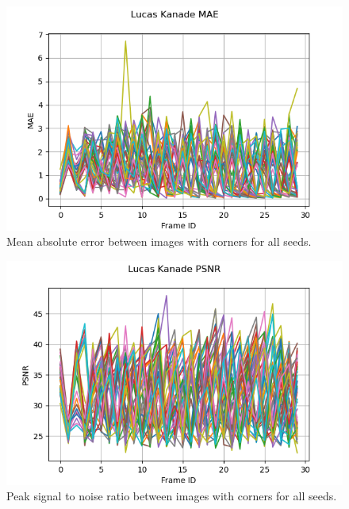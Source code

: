 \documentclass[11pt, conference, letterpaper]{IEEEtran}
\begin{document}
\begin{figure}[h]
    \centering
    \includegraphics[width=\linewidth]{mc_images/mc_lk_mae.png}
    \caption{Mean absolute error between images with corners for all seeds.}
    \label{fig:mc_lk_mae}
\end{figure}

\begin{figure}[h]
    \centering
    \includegraphics[width=\linewidth]{mc_images/mc_lk_psnr.png}
    \caption{Peak signal to noise ratio between images with corners for all seeds.}
    \label{fig:mc_lk_psnr}
\end{figure}
\end{document}
